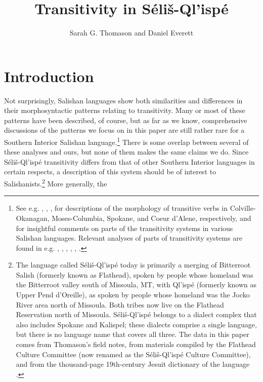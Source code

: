 \documentclass[output=paper,colorlinks,citecolor=brown]{langscibook}
\title{Transitivity in Séliš-Ql’ispé}
\author{Sarah G. Thomason\affiliation{University of Michigan} and
       Daniel Everett\affiliation{Bentley University}}
\begin{document}
\maketitle





\section{Introduction}
\label{thomason_section_1}
  Not surprisingly, Salishan languages show both similarities and
  differences in their morphosyntactic patterns relating to
  transitivity.  Many or most of these patterns have been described,
  of course, but as far as we know, comprehensive discussions of the
  patterns we focus on in this paper are still rather rare for a
  Southern Interior Salishan language.\footnote{See e.g.
  , , ,
   for descriptions of
  the morphology of transitive verbs in Colville-Okanagan,
  Moses-Columbia, Spokane, and Coeur d'Alene, respectively, and
   for insightful comments on parts of the transitivity
  systems in various Salishan languages.  Relevant analyses of parts
  of transitivity systems are found in e.g. ,
  , , ,
  , .}
  There is some overlap between several of these analyses and ours,
  but none of them makes the same claims we do.  Since
  S\'eli\v{s}-Ql'isp\'e transitivity differs from that of other
  Southern Interior languages in certain respects, a description of
  this system should be of interest to Salishanists.\footnote{The
  language called S\'eli\v{s}-Ql'isp\'e today is primarily a merging
  of Bitterroot Salish (formerly known as Flathead), spoken by people
  whose homeland was the Bitterroot valley south of Missoula, MT,
  with Ql'isp\'e (formerly known as Upper Pend d'Oreille), as spoken
  by people whose homeland was the Jocko River area north of
  Missoula.  Both tribes now live on the Flathead Reservation north
  of Missoula.  S\'eli\v{s}-Ql'isp\'e belongs to a dialect complex
  that also includes Spokane and Kalispel; these dialects comprise a
  single language, but there is no language name that covers all
  three.  The data in this paper comes from Thomason's field notes,
  from materials compiled by the Flathead Culture Committee (now
  renamed as the S\'eli\v{s}-Ql'isp\'e Culture Committee), and from
  the thousand-page 19th-century Jesuit dictionary of the language
  .}  More generally, the
\end{document}
